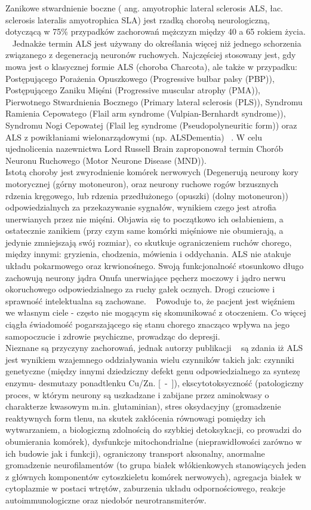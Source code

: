 \documentclass[twoside,a4paper]{book}
\begin{document}
Zanikowe stwardnienie boczne ( ang. amyotrophic lateral sclerosis ALS, łac. sclerosis lateralis
amyotrophica SLA) jest rzadką chorobą neurologiczną, dotyczącą  w 75\% przypadków zachorowań mężczyzn między 40 a 65 rokiem życia. ~\cite{neurology} Jednakże termin ALS jest używany do określania więcej niż jednego schorzenia związanego z degeneracją neuronów ruchowych.  Najczęściej stosowany jest, gdy mowa jest o klasycznej formie ALS (choroba Charcota), ale także w przypadku: Postępującego Porażenia Opuszkowego (Progressive bulbar palsy (PBP)), Postępującego Zaniku Mięśni (Progressive muscular atrophy (PMA)), Pierwotnego Stwardnienia Bocznego (Primary lateral sclerosis  (PLS)), Syndromu Ramienia Cepowatego (Flail arm syndrome (Vulpian-Bernhardt syndrome)),  Syndromu Nogi Cepowatej (Flail leg syndrome  (Pseudopolyneuritic form)) oraz ALS  z powikłaniami wielonarządowymi  (np. ALSDementia) ~\cite{alsWij}. W celu ujednolicenia nazewnictwa Lord Russell Brain zaproponował termin Chorób Neuronu Ruchowego (Motor Neurone Disease (MND)). ~\cite{alsWij}\\
Istotą choroby jest zwyrodnienie komórek nerwowych (Degenerują neurony kory motorycznej (górny motoneuron), oraz neurony ruchowe rogów brzusznych rdzenia kręgowego, lub rdzenia przedłużonego (opuszki) (dolny motoneuron)) odpowiedzialnych za przekazywanie sygnałów, wynikiem czego jest atrofia unerwianych przez nie mięśni. Objawia się to początkowo ich osłabieniem, a ostatecznie zanikiem (przy czym same komórki mięśniowe nie obumierają, a jedynie zmniejszają swój rozmiar), co skutkuje ograniczeniem ruchów chorego, między innymi: gryzienia, chodzenia, mówienia i oddychania. ALS nie atakuje układu pokarmowego oraz krwionośnego. Swoją funkcjonalność stosunkowo długo zachowują neurony jądra Onufa unerwiające pęcherz moczowy i jądro nerwu okoruchowego odpowiedzialnego za ruchy gałek ocznych. Drogi czuciowe i sprawność intelektualna są zachowane. ~\cite{parkinsonALS} Powoduje to, że pacjent jest więźniem we własnym ciele - często nie mogącym się skomunikować z otoczeniem.  Co więcej ciągła świadomość pogarszającego się stanu chorego znacząco wpływa na jego samopoczucie i zdrowie psychiczne, prowadząc do depresji. \\
Nieznane są przyczyny zachorowań, jednak autorzy publikacji ~\cite{alsWij} są zdania iż ALS jest wynikiem wzajemnego oddziaływania wielu czynników takich jak: czynniki genetyczne (między innymi dziedziczny defekt genu odpowiedzialnego za syntezę enzymu- desmutazy ponadtlenku Cu/Zn. [~\cite{neurology}-~\cite{alsWij}]), ekscytotoksyczność (patologiczny proces, w którym neurony są uszkadzane i zabijane przez aminokwasy o charakterze kwasowym m.in. glutaminian), stres oksydacyjny (gromadzenie reaktywnych form tlenu, na skutek zakłócenia równowagi pomiędzy ich wytwarzaniem, a biologiczną zdolnością do szybkiej detoksykacji, co prowadzi do obumierania komórek), dysfunkcje mitochondrialne (nieprawidłowości zarówno w ich budowie jak i funkcji), ograniczony transport aksonalny, anormalne gromadzenie neurofilamentów (to grupa białek włókienkowych stanowiących jeden z głównych komponentów cytoszkieletu komórek nerwowych), agregacja białek w cytoplazmie w postaci wtrętów, zaburzenia układu odpornościowego, reakcje autoimmunologiczne oraz niedobór neurotransmiterów.
\end{document}
